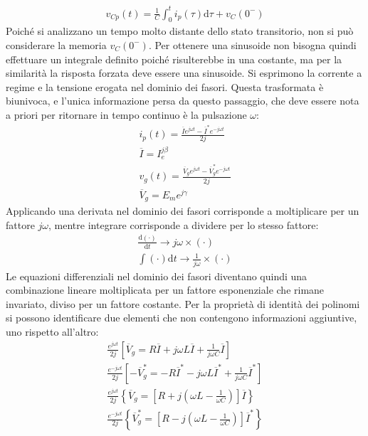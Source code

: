 \documentclass{article}
\newcommand{\df}{\mathrm{d}}
\numberwithin{equation}{subsection}
\begin{document}
\begin{gather*}
    v_{Cp}(t)=\displaystyle\frac{1}{C}\int_{0}^{t}i_p(\tau)\df\tau+v_C(0^-)
\end{gather*}
Poiché si analizzano un tempo molto distante dello stato transitorio, non si può considerare la memoria $v_C(0^-)$. Per ottenere una sinusoide non bisogna quindi effettuare 
un integrale definito poiché risulterebbe in una costante, ma per la similarità la risposta forzata deve essere una sinusoide. 
Si esprimono la corrente a regime e la tensione erogata nel dominio dei fasori. Questa trasformata è biunivoca, e l'unica informazione persa da questo passaggio, che deve 
essere nota a priori per ritornare in tempo continuo è la pulsazione $\omega$:
\begin{gather*}
    i_p(t)=\displaystyle\frac{\overline{I}e^{j\omega t}-\overline{I}^*e^{-j\omega t}}{2j}\\
    \overline{I}=I_e^{j\beta}\\
    v_{g}(t)=\displaystyle\frac{\overline{V}_ge^{j\omega t}-\overline{V}_g^*e^{-j\omega t}}{2j}\\
    \overline{V}_g=E_me^{j\gamma}
\end{gather*}
Applicando una derivata nel dominio dei fasori corrisponde a moltiplicare per un fattore $j\omega$, mentre integrare corrisponde a dividere per lo stesso 
fattore:
\begin{gather*}
    \displaystyle\frac{\df(\cdot)}{\df t}\to j\omega\times(\cdot)\\
    \displaystyle\int (\cdot)\df t\to\displaystyle\frac{1}{j\omega}\times(\cdot)
\end{gather*}
Le equazioni differenziali nel dominio dei fasori diventano quindi una combinazione lineare moltiplicata per un fattore esponenziale che rimane invariato, diviso per un 
fattore costante. Per la proprietà di identità dei polinomi si possono identificare due elementi che non contengono informazioni aggiuntive, uno rispetto all'altro: 
\begin{gather*}
    \displaystyle\frac{e^{j\omega t}}{2j}\left[\overline{V}_g=R\overline{I}+j\omega L\overline{I}+\frac{1}{j\omega C}\overline{I}\right]\\
    \displaystyle\frac{e^{-j\omega t}}{2j}\left[-\overline{V}_g^*=-R\overline{I}^*-j\omega L\overline{I}^*+\frac{1}{j\omega C}\overline{I}^*\right]\\
    \displaystyle\frac{e^{j\omega t}}{2j}\left\{\overline{V}_g=\left[R+j\left(\omega L-\frac{1}{\omega C}\right)\right]\overline{I}\right\}\\
    \displaystyle\frac{e^{-j\omega t}}{2j}\left\{\overline{V}_g^*=\left[R-j\left(\omega L-\frac{1}{\omega C}\right)\right]\overline{I}^*\right\}
\end{gather*}
\end{document}

